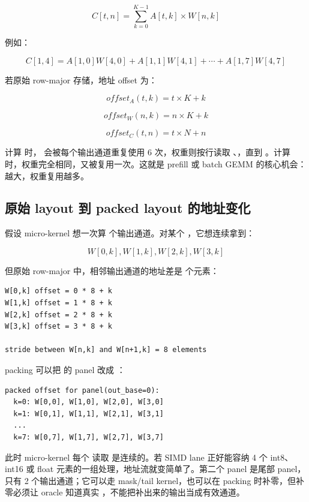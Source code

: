 \[
C[t,n] = \sum_{k=0}^{K-1} A[t,k] \times W[n,k]
\]

例如：

\[
C[1,4] =
A[1,0]W[4,0] + A[1,1]W[4,1] + \cdots + A[1,7]W[4,7]
\]

若原始 row-major 存储，地址 offset 为：

\[
offset_A(t,k) = t \times K + k
\]

\[
offset_W(n,k) = n \times K + k
\]

\[
offset_C(t,n) = t \times N + n
\]

计算  时， 会被每个输出通道重复使用 6 次，权重则按行读取 、，直到 。计算  时，权重完全相同，又被复用一次。这就是 prefill 或 batch GEMM 的核心机会： 越大，权重复用越多。

\subsection{原始 layout 到 packed layout 的地址变化}

假设 micro-kernel 想一次算  个输出通道。对某个 ，它想连续拿到：

\[
W[0,k], W[1,k], W[2,k], W[3,k]
\]

但原始 row-major  中，相邻输出通道的地址差是  个元素：

\begin{lstlisting}[numbers=none,caption={原始 W 在同一个 k 下跨输出通道}]
W[0,k] offset = 0 * 8 + k
W[1,k] offset = 1 * 8 + k
W[2,k] offset = 2 * 8 + k
W[3,k] offset = 3 * 8 + k

stride between W[n,k] and W[n+1,k] = 8 elements
\end{lstlisting}

packing 可以把  的 panel 改成 ：

\begin{lstlisting}[numbers=none,caption={BN=4 的 packed panel}]
packed offset for panel(out_base=0):
  k=0: W[0,0], W[1,0], W[2,0], W[3,0]
  k=1: W[0,1], W[1,1], W[2,1], W[3,1]
  ...
  k=7: W[0,7], W[1,7], W[2,7], W[3,7]
\end{lstlisting}

此时 micro-kernel 每个  读取  是连续的。若 SIMD lane 正好能容纳 4 个 int8、int16 或 float 元素的一组处理，地址流就变简单了。第二个 panel  是尾部 panel，只有 2 个输出通道；它可以走 mask/tail kernel，也可以在 packing 时补零，但补零必须让 oracle 知道真实 ，不能把补出来的输出当成有效通道。

